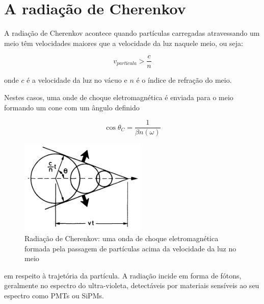 \chapter{A radiação de Cherenkov}\label{apdx:cherenkov}

A radiação de Cherenkov acontece quando partículas carregadas atravessando um meio têm velocidades maiores que a velocidade da luz naquele meio, ou seja:

\begin{equation}
    v_{partícula} > \dfrac{c}{n}
\end{equation}

onde $c$ é a velocidade da luz no vácuo e $n$ é o índice de refração do meio.

Nestes casos, uma onde de choque eletromagnética é enviada para o meio formando um cone com um ângulo definido 

\begin{equation}
    \cos{\theta_C} = \dfrac{1}{\beta n(\omega)}
\end{equation}

\begin{figure}[H]
    \centering
    \includegraphics[width=6cm]{postextuais/apendice/figuras/cherenkov.png}
    \caption{Radiação de Cherenkov: uma onda de choque eletromagnética formada pela passagem de partículas acima da velocidade da luz no meio}
    \label{fig:my_label}
\end{figure}

em respeito à trajetória da partícula. A radiação incide em forma de fótons, geralmente no espectro do ultra-violeta, detectáveis por materiais sensíveis ao seu espectro como PMTs ou \ac{SiPMs}.